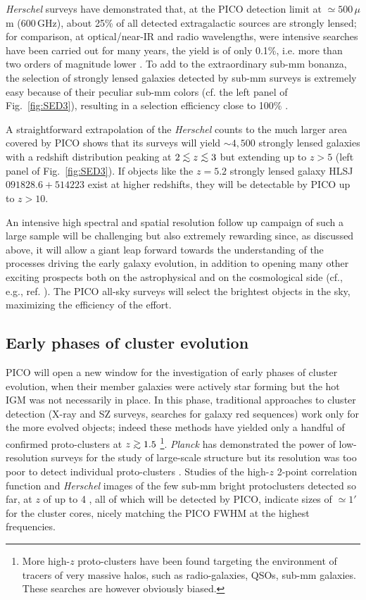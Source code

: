 \documentclass[11pt,a4paper]{article}
\def\simlt{\mathrel{\rlap{\lower 3pt\hbox{$\sim$}}\raise 2.0pt\hbox{$<$}}}
\def\simgt{\mathrel{\rlap{\lower 3pt\hbox{$\sim$}} \raise2.0pt\hbox{$>$}}}
\begin{document}
\textit{Herschel} surveys have demonstrated that, at the PICO detection limit at $\simeq 500\,\mu$m (600\,GHz), about 25\% of all detected extragalactic sources are strongly lensed; for comparison, at optical/near-IR and radio wavelengths, were intensive searches have been carried out for many years, the yield is of only 0.1\%, i.e. more than two orders of magnitude lower \cite{Treu2010}. To add to the extraordinary sub-mm bonanza, the selection of strongly lensed galaxies detected by sub-mm surveys is extremely easy because of their peculiar sub-mm colors (cf. the left panel of Fig.~\ref{fig:SED3}), resulting in a selection efficiency close to 100\% \cite{Negrello2010}.

A straightforward extrapolation of the \textit{Herschel} counts to the much larger area covered by PICO shows that its surveys will yield $\sim 4,500$ strongly lensed galaxies with a redshift distribution peaking at $2\simlt z \simlt 3$ \cite{Negrello2017lensed} but extending up to $z> 5$ (left panel of Fig.~\ref{fig:SED3}). If objects like the $z=5.2$ strongly lensed galaxy HLSJ$091828.6+514223$ exist at higher redshifts, they will be detectable by PICO up to $z>10$.

An intensive high spectral and spatial resolution follow up campaign of such a large sample will be challenging but also extremely rewarding since, as discussed above, it will allow a giant leap forward towards the understanding of the processes driving the early galaxy evolution, in addition to opening many other exciting prospects both on the astrophysical and on the cosmological side (cf., e.g., ref. \cite{Treu2010}). The PICO all-sky surveys will select the brightest objects in the sky, maximizing the efficiency of the effort.

\subsection{Early phases of cluster evolution}

PICO will open a new window for the investigation of early phases of cluster evolution, when their member galaxies were actively star forming but the hot IGM was not necessarily in place. In this phase, traditional approaches to cluster detection (X-ray and SZ surveys, searches for galaxy red sequences) work only for the more evolved objects; indeed these methods have yielded only a handful of confirmed proto-clusters at $z\simgt 1.5$ \cite{Overzier2016}\footnote{More high-$z$ proto-clusters have been found targeting the environment of tracers of very massive halos, such as radio-galaxies, QSOs, sub-mm galaxies. These searches are however obviously biased.}.
\textit{Planck} has demonstrated the power of low-resolution surveys for the study of large-scale structure  \cite{Planck2016high_z} but its resolution was too poor to detect individual proto-clusters \cite{Negrello2017protocl}.  Studies of the high-$z$ 2-point correlation function \cite{Chen2016, Negrello2017protocl} and \textit{Herschel} images of the few sub-mm bright protoclusters detected so far, at $z$ of up to 4 \cite{Ivison2013, Wang2016, Oteo2018}, all of which will be detected by PICO, indicate sizes of $\simeq 1'$ for the cluster cores, nicely matching the PICO FWHM at the highest frequencies.
\end{document}
